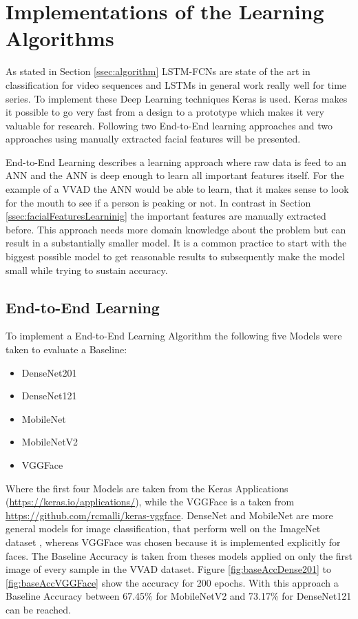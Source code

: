 \section{Implementations of the Learning Algorithms}\label{sec:implLearning}
As stated in Section \ref{ssec:algorithm} LSTM-FCNs are state of the art in classification for video sequences and LSTMs in general work really well for time series.
To implement these Deep Learning techniques Keras is used.
Keras makes it possible to go very fast from a design to a prototype which makes it very valuable for research.
Following two End-to-End learning approaches and two approaches using manually extracted facial features will be presented.

End-to-End Learning describes a learning approach where raw data is feed to an ANN and the ANN is deep enough to learn all important features itself. For the example of a VVAD the ANN would be able to learn, that it makes sense to look for the mouth to see if a person is peaking or not.
In contrast in Section \ref{ssec:facialFeaturesLearninig} the important features are manually extracted before.
This approach needs more domain knowledge about the problem but can result in a substantially smaller model.
It is a common practice to start with the biggest possible model to get reasonable results to subsequently make the model small while trying to sustain accuracy.


\subsection{End-to-End Learning}\label{ssec:EndToEndLearning} %
To implement a End-to-End Learning Algorithm the following five Models  were taken to evaluate a Baseline:

\begin{itemize}
\item DenseNet201
\item DenseNet121
\item MobileNet
\item MobileNetV2
\item VGGFace
\end{itemize}

Where the first four Models are taken from the Keras Applications (\url{https://keras.io/applications/}), while the VGGFace is a taken from \url{https://github.com/rcmalli/keras-vggface}. 
DenseNet and MobileNet are more general models for image classification, that perform well on the ImageNet dataset \cite{imagenet_cvpr09}, whereas VGGFace was chosen because it is implemented explicitly for faces.
The Baseline Accuracy is taken from theses models applied on only the first image of every sample in the VVAD dataset.
Figure \ref{fig:baseAccDense201} to \ref{fig:baseAccVGGFace} show the accuracy for 200 epochs.
With this approach a Baseline Accuracy between 67.45\% for MobileNetV2 and 73.17\% for DenseNet121 can be reached.


